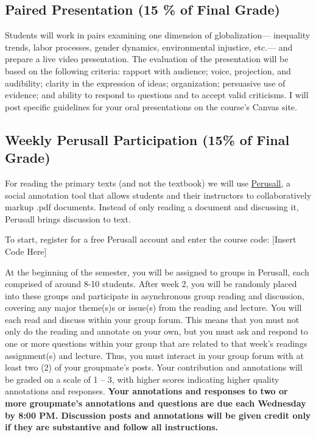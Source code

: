 \documentclass[11pt,]{article}
\begin{document}
\hypertarget{paired-presentation-15-of-final-grade}{%
\subsection{Paired Presentation (15 \% of Final
Grade)}\label{paired-presentation-15-of-final-grade}}

Students will work in pairs examining one dimension of globalization---
inequality trends, labor processes, gender dynamics, environmental
injustice, etc.--- and prepare a live video presentation. The evaluation
of the presentation will be based on the following criteria: rapport
with audience; voice, projection, and audibility; clarity in the
expression of ideas; organization; persuasive use of evidence; and
ability to respond to questions and to accept valid criticisms. I will
post specific guidelines for your oral presentations on the course's
Canvas site.

\hypertarget{weekly-perusall-participation-15-of-final-grade}{%
\subsection{Weekly Perusall Participation (15\% of Final
Grade)}\label{weekly-perusall-participation-15-of-final-grade}}

For reading the primary texts (and not the textbook) we will use
\href{https://support.perusall.com/hc/en-us}{Perusall}, a social
annotation tool that allows students and their instructors to
collaboratively markup .pdf documents. Instead of only reading a
document and discussing it, Perusall brings discussion to text.

To start, register for a free Perusall account and enter the course
code: {[}Insert Code Here{]}

At the beginning of the semester, you will be assigned to groups in
Perusall, each comprised of around 8-10 students. After week 2, you will
be randomly placed into these groups and participate in asynchronous
group reading and discussion, covering any major theme(s)s or issue(s)
from the reading and lecture. You will each read and discuss within your
group forum. This means that you must not only do the reading and
annotate on your own, but you must ask and respond to one or more
questions within your group that are related to that week's readings
assignment(s) and lecture. Thus, you must interact in your group forum
with at least two (2) of your groupmate's posts. Your contribution and
annotations will be graded on a scale of 1 -- 3, with higher scores
indicating higher quality annotations and responses. \textbf{Your
annotations and responses to two or more groupmate's annotations and
questions are due each Wednesday by 8:00 PM. Discussion posts and
annotations will be given credit only if they are substantive and follow
all instructions.}
\end{document}
